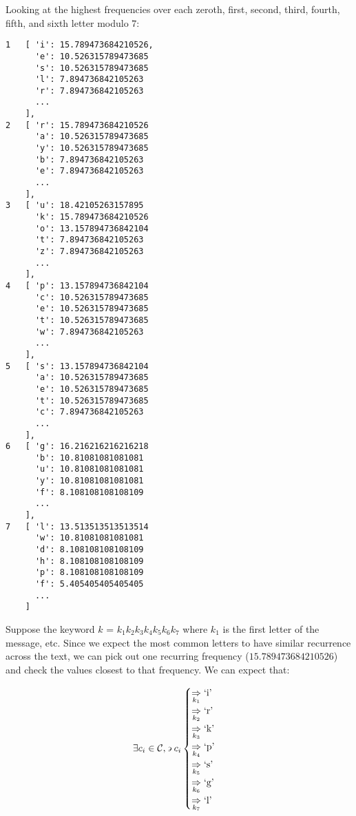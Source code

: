 \begin{Answer}
\noindent
Looking at the highest frequencies over each zeroth, first,
second, third, fourth, fifth, and sixth letter modulo $7$:
\begin{multicols*}{2}
\begin{Verbatim}[commandchars=\\\{\}]
1   [ 'i': 15.789473684210526,
      'e': 10.526315789473685
      's': 10.526315789473685
      'l': 7.894736842105263
      'r': 7.894736842105263
      ...
    ],
2   [ 'r': 15.789473684210526
      'a': 10.526315789473685
      'y': 10.526315789473685
      'b': 7.894736842105263
      'e': 7.894736842105263 
      ...
    ],
3   [ 'u': 18.42105263157895
      'k': 15.789473684210526
      'o': 13.157894736842104
      't': 7.894736842105263
      'z': 7.894736842105263
      ...
    ],
4   [ 'p': 13.157894736842104
      'c': 10.526315789473685
      'e': 10.526315789473685
      't': 10.526315789473685
      'w': 7.894736842105263
      ...
    ],
5   [ 's': 13.157894736842104
      'a': 10.526315789473685
      'e': 10.526315789473685
      't': 10.526315789473685
      'c': 7.894736842105263
      ...
    ],
6   [ 'g': 16.216216216216218
      'b': 10.81081081081081
      'u': 10.81081081081081
      'y': 10.81081081081081
      'f': 8.108108108108109
      ...
    ],
7   [ 'l': 13.513513513513514
      'w': 10.81081081081081
      'd': 8.108108108108109
      'h': 8.108108108108109
      'p': 8.108108108108109
      'f': 5.405405405405405
      ...
    ]
\end{Verbatim}
\end{multicols*}
\noindent
\noindent
Suppose the keyword $k$ = $k_{1}k_{2}k_{3}k_{4}k_{5}k_{6}k_{7}$
where $k_{1}$ is the first letter of the message, etc.
\newline
Since we expect the most common letters to have similar recurrence across the text,
we can pick out one recurring frequency ($15.789473684210526$) and check the values closest to that frequency.
\newline
We can expect that:

\begin{align*}
\exists c_{i} \in \mathcal{C}, \backepsilon c_{i} \begin{cases}
  \underset{k_{1}}{\Rightarrow} \text{`i'}\\
  \underset{k_{2}}{\Rightarrow} \text{`r'}\\
  \underset{k_{3}}{\Rightarrow} \text{`k'}\\
  \underset{k_{4}}{\Rightarrow} \text{`p'}\\
  \underset{k_{5}}{\Rightarrow} \text{`s'}\\
  \underset{k_{6}}{\Rightarrow} \text{`g'}\\
  \underset{k_{7}}{\Rightarrow} \text{`l'}
\end{cases} 
\end{align*}


\end{Answer}
